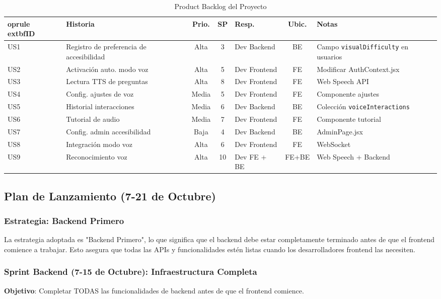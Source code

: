 \documentclass[12pt]{article}
\begin{document}
\clearpage
\begin{table}[!htbp]
\centering
\footnotesize
\caption{Product Backlog del Proyecto}
\begin{tabular}{@{}l p{} c c p{} c p{}@{}}
	oprule
	extbf{ID} & \textbf{Historia} & \textbf{Prio.} & \textbf{SP} & \textbf{Resp.} & \textbf{Ubic.} & \textbf{Notas} \\
\midrule
US1 & Registro de preferencia de accesibilidad & Alta & 3 & Dev Backend & BE & Campo \texttt{visualDifficulty} en usuarios \\
US2 & Activación auto. modo voz & Alta & 5 & Dev Frontend & FE & Modificar AuthContext.jsx \\
US3 & Lectura TTS de preguntas & Alta & 8 & Dev Frontend & FE & Web Speech API \\
US4 & Config. ajustes de voz & Media & 5 & Dev Frontend & FE & Componente ajustes \\
US5 & Historial interacciones & Media & 6 & Dev Backend & BE & Colección \texttt{voiceInteractions} \\
US6 & Tutorial de audio & Media & 7 & Dev Frontend & FE & Componente tutorial \\
US7 & Config. admin accesibilidad & Baja & 4 & Dev Backend & BE & AdminPage.jsx \\
US8 & Integración modo voz & Alta & 6 & Dev Frontend & FE & WebSocket \\
US9 & Reconocimiento voz & Alta & 10 & Dev FE + BE & FE+BE & Web Speech + Backend \\
\bottomrule
\end{tabular}
\label{tab:product-backlog}
\end{table}

\subsection{Plan de Lanzamiento (7-21 de Octubre)}

\subsubsection{Estrategia: Backend Primero}
La estrategia adoptada es "Backend Primero", lo que significa que el backend debe estar completamente terminado antes de que el frontend comience a trabajar. Esto asegura que todas las APIs y funcionalidades estén listas cuando los desarrolladores frontend las necesiten.

\subsubsection{Sprint Backend (7-15 de Octubre): Infraestructura Completa}
\textbf{Objetivo}: Completar TODAS las funcionalidades de backend antes de que el frontend comience.
\end{document}
